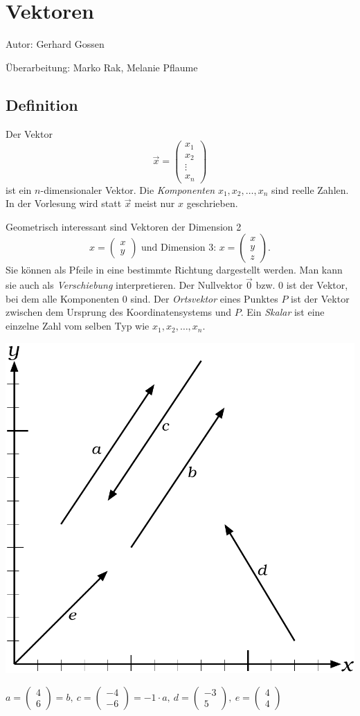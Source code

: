 \def\vect#1,#2{\left(\!\!\!\begin{array}{c}#1\\#2\end{array}\!\!\!\right)}
\newcommand{\mvect}[1]{\left(\!\!\!\begin{array}{c}#1%
\end{array}\!\!\!\right)}

\chapter{Vektoren}
	
	Autor: Gerhard Gossen
	
\noindent	\"Uberarbeitung: Marko Rak, Melanie Pflaume
	
	\section{Definition}
	
		Der Vektor \[\overrightarrow{
        x
        }
         = \mvect{ x_1\\ x_2 \\ \vdots \\ x_n}\] ist
		ein $n$-dimensionaler Vektor. Die \emph{Komponenten} $x_1, x_2,
		\dots, x_n$ sind reelle Zahlen. In der Vorlesung wird statt
		$\overrightarrow{x}$ meist nur $x$ geschrieben.
		
		\noindent Geometrisch interessant sind Vektoren der Dimension 2 \[x =
		\mvect{x\\y} \text{ und Dimension 3: } x = \mvect{x\\y\\z}.\] Sie können als
		Pfeile in
		eine bestimmte Richtung dargestellt werden. Man kann sie auch als
		\emph{Verschiebung} interpretieren.
		Der Nullvektor $\overrightarrow0$ bzw. $0$ ist der Vektor, bei dem alle
		Komponenten $0$ sind.
		Der \emph{Ortsvektor} eines Punktes $P$ ist der Vektor 
		zwischen dem Ursprung des Koordinatensystems und $P$.
		Ein \emph{Skalar} ist eine einzelne Zahl vom selben Typ wie $x_1, x_2, \dots,
		x_n$.
		
		\begin{center}
			\includegraphics[width=.3\textwidth]{img/vektoren.pdf}
			
			{\scriptsize$a = \vect4,6 = b,\ c = \vect-4,{-6}=-1\cdot a,\ d= \vect{-3},5,\
			e=\vect4,4$}
		\end{center}
	
